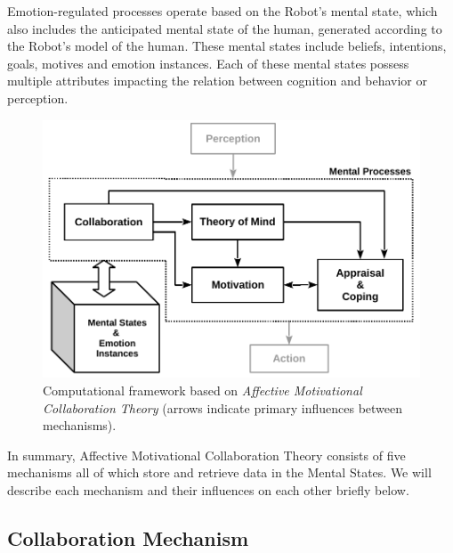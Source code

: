 Emotion-regulated processes operate based on the Robot's mental state, which
also includes the anticipated mental state of the human, generated according to
the Robot's model of the human. These mental states include beliefs, intentions,
goals, motives and emotion instances. Each of these mental states possess
multiple attributes impacting the relation between cognition and behavior or
perception.

\begin{figure}[h!]
  \includegraphics[scale=0.78]{figure/theory-general-croped.pdf}
  \caption{Computational framework based on \textit{Affective Motivational
  Collaboration Theory} (arrows indicate primary influences between
  mechanisms).}
  \label{fig:theory}
\end{figure}

In summary, Affective Motivational Collaboration Theory consists of five
mechanisms all of which store and retrieve data in the Mental States. We will
describe each mechanism and their influences on each other briefly below.

\subsection{Collaboration Mechanism}
\label{sec:collaboration-mech}

